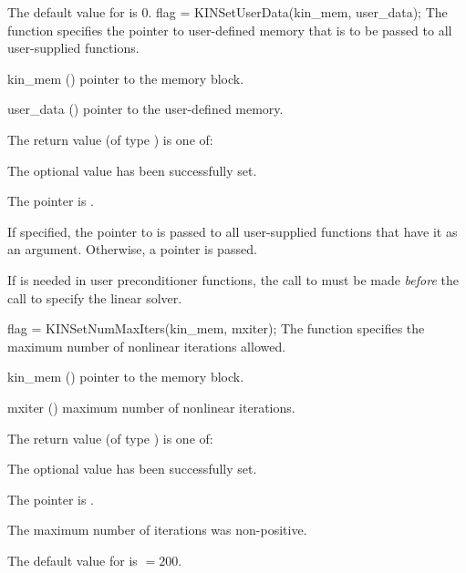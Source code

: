 {
  The default value for  is $0$.
}
{
flag = KINSetUserData(kin\_mem, user\_data);
}
{
  The function  specifies the pointer to user-defined memory
  that is to be passed to all user-supplied functions.
}
{
  \begin{args}
  \item[kin\_mem] ()
    pointer to the {\kinsol} memory block.
  \item[user\_data] ()
    pointer to the user-defined memory.
  \end{args}
}
{
  The return value  (of type ) is one of:
  \begin{args}
  \item[\Id{KIN\_SUCCESS}] 
    The optional value has been successfully set.
  \item[\Id{KIN\_MEM\_NULL}]
    The  pointer is .
  \end{args}
}
{
  If specified, the pointer to  is passed to all user-supplied 
  functions that have it as an argument. Otherwise, a  pointer is passed.

  If  is needed in user preconditioner functions, the call to
   must be made {\it before} the call to specify the
  linear solver.
}
{
flag = KINSetNumMaxIters(kin\_mem, mxiter);
}
{
  The function  specifies the maximum number of 
  nonlinear iterations allowed.
}
{
  \begin{args}
  \item[kin\_mem] ()
    pointer to the {\kinsol} memory block.
  \item[mxiter] ()
    maximum number of nonlinear iterations.
  \end{args}
}
{
  The return value  (of type ) is one of:
  \begin{args}
  \item[\Id{KIN\_SUCCESS}] 
    The optional value has been successfully set.
  \item[\Id{KIN\_MEM\_NULL}]
    The  pointer is .
  \item[\Id{KIN\_ILL\_INPUT}]
    The maximum number of iterations was non-positive.
  \end{args}
}
{
  The default value for  is  $=200$.
}
